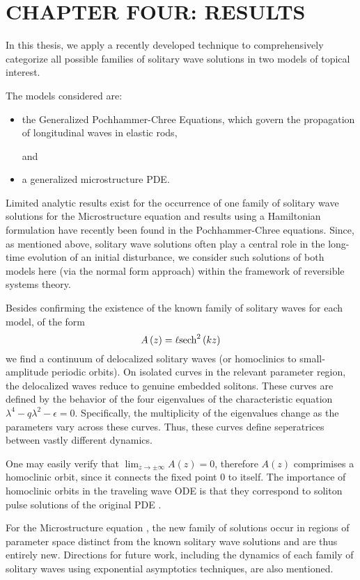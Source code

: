 \chapter{CHAPTER FOUR: RESULTS} \label{chapter_4}

In this thesis, we apply a recently developed technique to
comprehensively categorize all possible families of solitary wave
solutions in two models of topical interest.

The models considered are:
\begin{itemize}
\item the Generalized Pochhammer-Chree Equations, which  govern the propagation of longitudinal waves in elastic rods,

and

\item a generalized microstructure PDE.
\end{itemize}

Limited analytic results exist for the occurrence of one family of  solitary
wave solutions for the Microstructure equation and results using a Hamiltonian
formulation have recently been found in the Pochhammer-Chree equations. Since, as
mentioned above, solitary wave solutions often play a central role in the
long-time evolution of an initial disturbance, we consider such solutions of
both models here (via the normal form approach) within the framework of
reversible systems theory.

Besides confirming the existence of the known family of solitary waves for each
model, of the form
\begin{equation} 
A\left(z\right) = \ell \space \mathrm{sech}^2\left(k z\right)
\end{equation}
we find a continuum of delocalized solitary waves (or homoclinics to
small-amplitude periodic orbits).  On isolated curves in the relevant parameter
region, the delocalized waves reduce to genuine embedded solitons. 
These curves are defined by the behavior of the four eigenvalues of the characteristic
equation $ \lambda^4 - q \lambda^2 - \epsilon =  0$. Specifically, the 
multiplicity of the eigenvalues change as the parameters vary across these curves.
Thus, these curves define seperatrices between vastly different dynamics.


One may easily verify that $\lim_{z\rightarrow\pm\infty} A(z) = 0$, therefore
$A(z)$ comprimises a homoclinic orbit, since it connects the fixed point $0$ to
itself. The importance of homoclinic orbits in the traveling wave ODE is that
they correspond to soliton pulse solutions of the original PDE \cite{IA}.

For the Microstructure equation , the new family of solutions occur in regions
of parameter space distinct from the known solitary wave solutions and are thus
entirely new.  Directions for future work, including the dynamics of each family
of solitary waves using exponential asymptotics techniques, are also mentioned.

